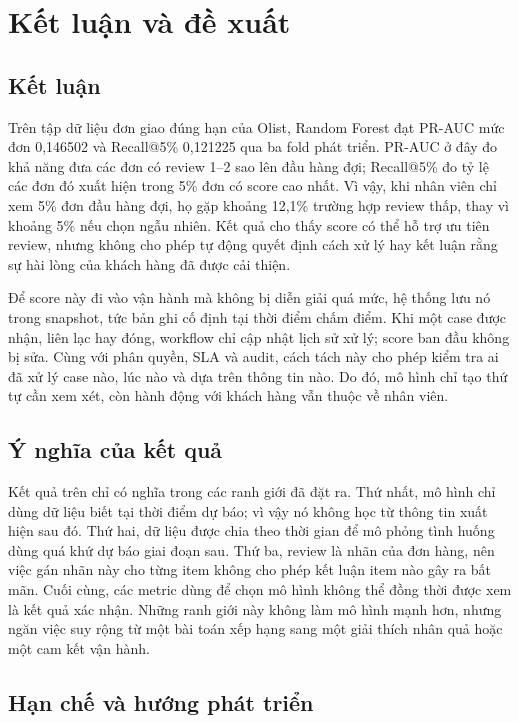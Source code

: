 \chapter{Kết luận và đề xuất}\label{ch:conclusion}

\section{Kết luận}

Trên tập dữ liệu đơn giao đúng hạn của Olist, Random Forest đạt PR-AUC mức đơn 0,146502 và Recall@5\% 0,121225 qua ba fold phát triển. PR-AUC ở đây đo khả năng đưa các đơn có review 1--2 sao lên đầu hàng đợi; Recall@5\% đo tỷ lệ các đơn đó xuất hiện trong 5\% đơn có score cao nhất. Vì vậy, khi nhân viên chỉ xem 5\% đơn đầu hàng đợi, họ gặp khoảng 12,1\% trường hợp review thấp, thay vì khoảng 5\% nếu chọn ngẫu nhiên. Kết quả cho thấy score có thể hỗ trợ ưu tiên review, nhưng không cho phép tự động quyết định cách xử lý hay kết luận rằng sự hài lòng của khách hàng đã được cải thiện.

Để score này đi vào vận hành mà không bị diễn giải quá mức, hệ thống lưu nó trong snapshot, tức bản ghi cố định tại thời điểm chấm điểm. Khi một case được nhận, liên lạc hay đóng, workflow chỉ cập nhật lịch sử xử lý; score ban đầu không bị sửa. Cùng với phân quyền, SLA và audit, cách tách này cho phép kiểm tra ai đã xử lý case nào, lúc nào và dựa trên thông tin nào. Do đó, mô hình chỉ tạo thứ tự cần xem xét, còn hành động với khách hàng vẫn thuộc về nhân viên.

\section{Ý nghĩa của kết quả}

Kết quả trên chỉ có nghĩa trong các ranh giới đã đặt ra. Thứ nhất, mô hình chỉ dùng dữ liệu biết tại thời điểm dự báo; vì vậy nó không học từ thông tin xuất hiện sau đó. Thứ hai, dữ liệu được chia theo thời gian để mô phỏng tình huống dùng quá khứ dự báo giai đoạn sau. Thứ ba, review là nhãn của đơn hàng, nên việc gán nhãn này cho từng item không cho phép kết luận item nào gây ra bất mãn. Cuối cùng, các metric dùng để chọn mô hình không thể đồng thời được xem là kết quả xác nhận. Những ranh giới này không làm mô hình mạnh hơn, nhưng ngăn việc suy rộng từ một bài toán xếp hạng sang một giải thích nhân quả hoặc một cam kết vận hành.

\section{Hạn chế và hướng phát triển}\label{sec:future-work}

